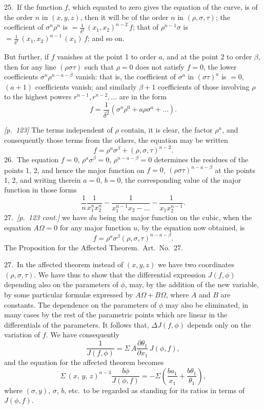 \documentclass[11pt,a4paper]{book}
\begin{document}
25.\ If the function $f$, which equated to zero gives the equation of the curve, is of the order $n$ in $(x, y, z)$, then it will be of the order $n$ in $(\rho, \sigma, \tau)$; the coefficient of $\sigma^n \rho^n$ is $= \frac{1}{\delta^2}\,(x_1, x_2)^{n-2}\,f$; that of $\rho^{n-1}\sigma$ is $= \frac{1}{\delta^2}\,(x_1, x_2)^{n-1}\,(x_1)\,f$; and so on.

But further, if $f$ vanishes at the point 1 to order $a$, and at the point 2 to order $\beta$, then for any line $(\rho \sigma \tau)$ such that $\rho = 0$ does not satisfy $f = 0$, the lower coefficients $\sigma^n \rho^{n-a-\beta}$ vanish: that is, the coefficient of $\sigma^a$ in $(\sigma \tau)^a$ is $= 0$, $(a + 1)$ coefficients vanish; and similarly $\beta + 1$ coefficients of those involving $\rho$ to the highest powers $r^{n-1}, r^{n-2}, ...$ are in the form
\[
f = \frac{1}{\delta^2}(\sigma^n \rho^0 + a \rho \sigma^a + ...).
\]

\noindent\textit{[p.~123]} The terms independent of $\rho$ contain, it is clear, the factor $\rho^n$, and consequently those terms from the others, the equation may be written
\[
f = \rho^a \sigma^\beta + (\rho, \sigma, \tau)^{n - 2}.
\]
26.\ The equation $f = 0$, $\rho^a \sigma^\beta = 0$, $\rho^{n-a-\beta} = 0$ determines the residues of the points 1, 2, and hence the major function on $f = 0$, $(\rho \sigma \tau)^{n-a-\beta}$ at the points 1, 2, and writing therein $a = 0$, $b = 0$, the corresponding value of the major function in those forms
\[
\frac{1}{n}\frac{1}{x_1^n x_2^n} - \frac{1}{x_1^{n-1} x_2 - ...} - \frac{1}{x_1 x_2^{n-1}}.
\]
27.\ \textit{[p.~123 cont.]} we have $du$ being the major function on the cubic, when the equation $A\Omega = 0$ for any major function $u$, by the equation now obtained, is
\[
f = \rho^a \sigma^\beta (\rho, \sigma, \tau)^{n - a - \beta}.
\]
The Proposition for the Affected Theorem.\ Art.\ No.~27.

27.\ In the affected theorem instead of $(x, y, z)$ we have two coordinates $(\rho, \sigma, \tau)$. We have thus to show that the differential expression $J(f, \phi)$ depending also on the parameters of $\phi$, may, by the addition of the new variable, by some particular formul\ae{} expressed by $A\Omega + B\Omega$, where $A$ and $B$ are constants. The dependence on the parameters of $\phi$ may also be eliminated, in many cases by the rest of the parametric points which are linear in the differentials of the parameters. It follows that, $\Delta J(f, \phi)$ depends only on the variation of $f$. We have consequently
\[
\frac{1}{J(f, \phi)} = \Sigma\,A\frac{\partial \theta_1}{\partial x_1}\,J(\phi, f),
\]
and the equation for the affected theorem becomes
\[
\Sigma\,(x,\,y,\,z)^{n-3}\frac{b\phi}{J(\phi, f)} = -\Sigma\left(\frac{ba_1}{x_1} + \frac{b\theta_1}{\theta_1}\right),
\]
where $(\sigma, y)$, $\sigma$, $b$, etc.\ to be regarded as standing for its ratios in terms of $J(\phi, f)$.
\end{document}
